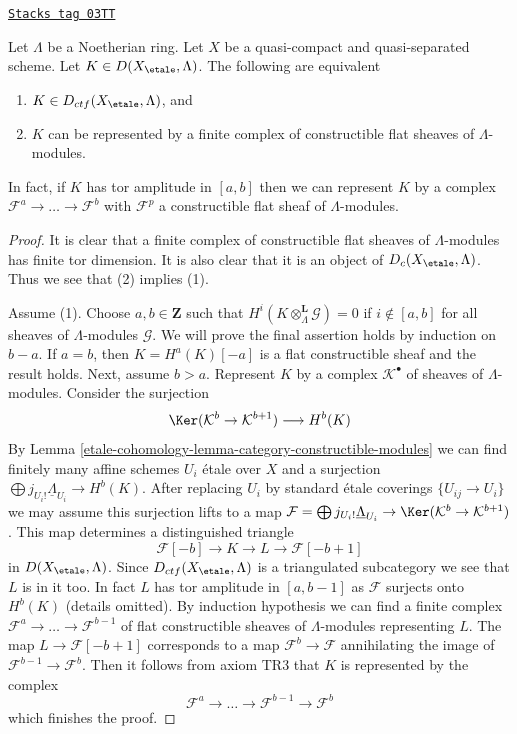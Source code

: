 \begin{lemma}
\label{etale-cohomology-lemma-when-ctf}
\href{https://stacks.math.columbia.edu/tag/03TT}{\texttt{Stacks tag 03TT}}

Let $\Lambda$ be a Noetherian ring. Let $X$ be a quasi-compact
and quasi-separated scheme. Let $K \in D(X_\etale, \Lambda)$. The following
are equivalent
\begin{enumerate}
\item $K \in D_{ctf}(X_\etale, \Lambda)$, and
\item $K$ can be represented by a finite complex of constructible
flat sheaves of $\Lambda$-modules.
\end{enumerate}
In fact, if $K$ has tor amplitude in $[a, b]$ then we can represent
$K$ by a complex $\mathcal{F}^a \to \ldots \to \mathcal{F}^b$ with
$\mathcal{F}^p$ a constructible flat sheaf of $\Lambda$-modules.
\end{lemma}

\begin{proof}
It is clear that a finite complex of constructible
flat sheaves of $\Lambda$-modules has finite tor dimension.
It is also clear that it is an object of $D_c(X_\etale, \Lambda)$.
Thus we see that (2) implies (1).

\medskip\noindent
Assume (1). Choose $a, b \in \mathbf{Z}$ such that
$H^i(K \otimes_\Lambda^\mathbf{L} \mathcal{G}) = 0$ if
$i \not \in [a, b]$ for all sheaves of $\Lambda$-modules $\mathcal{G}$.
We will prove the final assertion holds by induction on $b - a$. If
$a = b$, then $K = H^a(K)[-a]$ is a flat constructible sheaf
and the result holds. Next, assume $b > a$. Represent $K$
by a complex $\mathcal{K}^\bullet$ of sheaves of $\Lambda$-modules.
Consider the surjection
$$
\Ker(\mathcal{K}^b \to \mathcal{K}^{b + 1})
\longrightarrow
H^b(K)
$$
By Lemma \ref{etale-cohomology-lemma-category-constructible-modules}
we can find finitely many affine schemes $U_i$ \'etale over $X$ and a
surjection $\bigoplus j_{U_i!}\underline{\Lambda}_{U_i} \to H^b(K)$.
After replacing $U_i$ by standard \'etale coverings $\{U_{ij} \to U_i\}$
we may assume this surjection lifts to a map
$\mathcal{F} = \bigoplus j_{U_i!}\underline{\Lambda}_{U_i} \to
\Ker(\mathcal{K}^b \to \mathcal{K}^{b + 1})$.
This map determines a distinguished triangle
$$
\mathcal{F}[-b] \to K \to L \to \mathcal{F}[-b + 1]
$$
in $D(X_\etale, \Lambda)$. Since $D_{ctf}(X_\etale, \Lambda)$ is a triangulated
subcategory we see that $L$ is in it too. In fact $L$ has
tor amplitude in $[a, b - 1]$ as $\mathcal{F}$ surjects onto
$H^b(K)$ (details omitted). By induction hypothesis we can find
a finite complex $\mathcal{F}^a \to \ldots \to \mathcal{F}^{b - 1}$
of flat constructible sheaves of $\Lambda$-modules representing $L$.
The map $L \to \mathcal{F}[-b + 1]$ corresponds to a map
$\mathcal{F}^b \to \mathcal{F}$ annihilating the image
of $\mathcal{F}^{b - 1} \to \mathcal{F}^b$. Then it follows
from axiom TR3 that $K$ is represented by the complex
$$
\mathcal{F}^a \to \ldots \to \mathcal{F}^{b - 1} \to \mathcal{F}^b
$$
which finishes the proof.
\end{proof}

